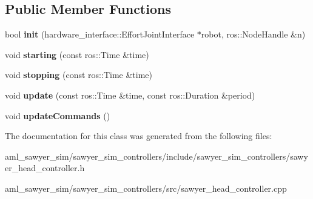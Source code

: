 \subsection*{Public Member Functions}
\begin{DoxyCompactItemize}
\item 
\hypertarget{classsawyer__sim__controllers_1_1_sawyer_head_controller_aef1fe8d663f6408fe9f90655fb628302}{bool {\bfseries init} (hardware\-\_\-interface\-::\-Effort\-Joint\-Interface $\ast$robot, ros\-::\-Node\-Handle \&n)}\label{classsawyer__sim__controllers_1_1_sawyer_head_controller_aef1fe8d663f6408fe9f90655fb628302}

\item 
\hypertarget{classsawyer__sim__controllers_1_1_sawyer_head_controller_a5aecc577e22bd36807a835b0c613d245}{void {\bfseries starting} (const ros\-::\-Time \&time)}\label{classsawyer__sim__controllers_1_1_sawyer_head_controller_a5aecc577e22bd36807a835b0c613d245}

\item 
\hypertarget{classsawyer__sim__controllers_1_1_sawyer_head_controller_a45b86611a3d2e20e73bdc9504d907b18}{void {\bfseries stopping} (const ros\-::\-Time \&time)}\label{classsawyer__sim__controllers_1_1_sawyer_head_controller_a45b86611a3d2e20e73bdc9504d907b18}

\item 
\hypertarget{classsawyer__sim__controllers_1_1_sawyer_head_controller_abecdfc5a248860a9a52d4b08261bbcd8}{void {\bfseries update} (const ros\-::\-Time \&time, const ros\-::\-Duration \&period)}\label{classsawyer__sim__controllers_1_1_sawyer_head_controller_abecdfc5a248860a9a52d4b08261bbcd8}

\item 
\hypertarget{classsawyer__sim__controllers_1_1_sawyer_head_controller_a15db2a07d6690de16fa52bb7ee21d54a}{void {\bfseries update\-Commands} ()}\label{classsawyer__sim__controllers_1_1_sawyer_head_controller_a15db2a07d6690de16fa52bb7ee21d54a}

\end{DoxyCompactItemize}


The documentation for this class was generated from the following files\-:\begin{DoxyCompactItemize}
\item 
aml\-\_\-sawyer\-\_\-sim/sawyer\-\_\-sim\-\_\-controllers/include/sawyer\-\_\-sim\-\_\-controllers/sawyer\-\_\-head\-\_\-controller.\-h\item 
aml\-\_\-sawyer\-\_\-sim/sawyer\-\_\-sim\-\_\-controllers/src/sawyer\-\_\-head\-\_\-controller.\-cpp\end{DoxyCompactItemize}
